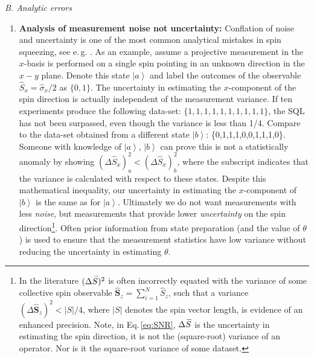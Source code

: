 \documentclass[reqno]{amsart}
\newcommand{\ket}[1]{\left| #1 \right>}
\newcommand{\myvec}[1]{\accentset{\rightharpoonup}{#1}}
\begin{document}
\noindent\textit{B. Analytic errors}
\begin{enumerate}
\item \textbf{Analysis of measurement noise not uncertainty:} Conflation of noise and uncertainty is one of the most common analytical mistakes in spin squeezing, see e.\,g. \cite{Orzel2001, Esteve2008, Appel2009, Gross2010, Koschorreck2010, Koschorreck2010a, Leroux2010, LouchetChauvet2010, Riedel2010, SchleierSmith2010, Sewell2012, Cox2016, Hosten2016, Kruse2016, Colombo2022, Greve2022, Malia2022}. As an example, assume a projective measurement in the $x$-basis is performed on a single spin pointing in an unknown direction in the $x-y$ plane. Denote this state $\ket{a}$ and label the outcomes of the observable $\hat{S}_x = \hat{\sigma}_x/2$ as $\{0, 1\}$. The uncertainty in estimating the $x$-component of the spin direction is actually independent of the measurement variance. If ten experiments produce the following data-set: $\{1,1,1,1,1,1,1,1,1,1\}$, the SQL has not been surpassed, even though the variance is less than 1/4. Compare to the data-set obtained from a different state $\ket{b}$: \{0,1,1,1,0,0,1,1,1,0\}. Someone with knowledge of $\ket{a}$, $\ket{b}$ can prove this is not a statistically anomaly by showing $\left(\Delta \hat{S}_x\right)^2_a < \left(\Delta \hat{S}_x\right)^2_b$, where the subscript indicates that the variance is calculated with respect to these states. Despite this mathematical inequality, our uncertainty in estimating the $x$-component of $\ket{b}$ is the same as for $\ket{a}$. Ultimately we do not want measurements with less \emph{noise}, but measurements that provide lower \emph{uncertainty} on the spin direction\footnote{In the literature $(\Delta \myvec{S})^2$ is often incorrectly equated with the variance of some collective spin observable $\hat{\bm{S}}_z = \sum_{i=1}^N \hat{S}_z$, such that a variance $\left(\Delta \hat{\bm{S}}_z\right)^2 <|S|/4$, where $|S|$ denotes the spin vector length, is evidence of an enhanced precision. Note, in Eq.\,\eqref{eq:SNR}, $\Delta \myvec{S}$ is the uncertainty in estimating the spin direction, it is not the (square-root) variance of an operator. Nor is it the square-root variance of some dataset.}. Often prior information from state preparation (and the value of $\theta$) is used to ensure that the measurement statistics have low variance without reducing the uncertainty in estimating $\theta$.


\end{enumerate}
\end{document}
